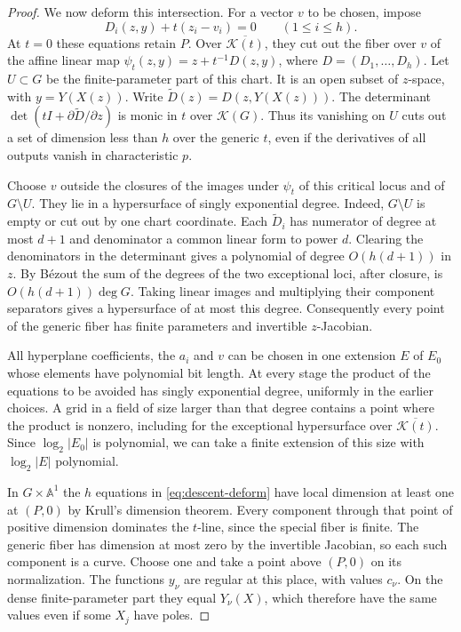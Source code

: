 \begin{proof}
We now deform this intersection. For a vector $v$ to be chosen, impose
\begin{equation}\label{eq:descent-deform}
                    D_i(z,y)+t(z_i-v_i)=0\qquad(1\le i\le h).
\end{equation}
At $t=0$ these equations retain $P$. Over $\overline{\mathcal K(t)}$,
they cut out the fiber over $v$ of the affine linear map
$\psi_t(z,y)=z+t^{-1}D(z,y)$, where $D=(D_1,\ldots,D_h)$.
Let $U\subset G$ be the finite-parameter part of this chart. It is an
open subset of $z$-space, with $y=Y(X(z))$. Write
$\widetilde D(z)=D(z,Y(X(z)))$. The determinant
$\det(tI+\partial\widetilde D/\partial z)$ is monic in $t$ over
$\mathcal K(G)$. Thus its vanishing on $U$ cuts out a set of dimension
less than $h$ over the generic $t$, even if the derivatives of all
outputs vanish in characteristic $p$.

Choose $v$ outside the closures of the images under $\psi_t$ of this
critical locus and of $G\setminus U$. They lie in a hypersurface of
singly exponential degree. Indeed, $G\setminus U$ is empty or cut out
by one chart coordinate. Each $\widetilde D_i$ has numerator of degree
at most $d+1$ and denominator a common linear form to power $d$.
Clearing the denominators in the determinant gives a polynomial of
degree $O(h(d+1))$ in $z$. By B\'ezout the sum of the degrees of the
two exceptional loci, after closure, is $O(h(d+1))\deg G$. Taking
linear images and multiplying their component separators gives a
hypersurface of at most this degree. Consequently every point
of the generic fiber has finite parameters and invertible $z$-Jacobian.

All hyperplane coefficients, the $a_i$ and $v$ can be chosen in one
extension $E$ of $E_0$ whose elements have polynomial bit length.
At every stage the product of the equations to be avoided has singly
exponential degree, uniformly in the earlier choices. A grid in a field
of size larger than that degree contains a point where the product is
nonzero, including for the exceptional hypersurface over
$\overline{\mathcal K(t)}$. Since $\log_2|E_0|$ is polynomial, we
can take a finite extension of this size with $\log_2|E|$ polynomial.

In $G\times\mathbb A^1$ the $h$ equations in
\eqref{eq:descent-deform} have local dimension at least one at $(P,0)$
by Krull's dimension theorem. Every component through that point of positive
dimension dominates the $t$-line, since the special fiber is finite.
The generic fiber has dimension at most zero by the invertible Jacobian,
so each such component is a curve. Choose one and take a point above
$(P,0)$ on its normalization. The functions $y_\nu$ are regular at
this place, with values $c_\nu$. On the dense finite-parameter part
they equal $Y_\nu(X)$, which therefore have the same values even if
some $X_j$ have poles.


\end{proof}
